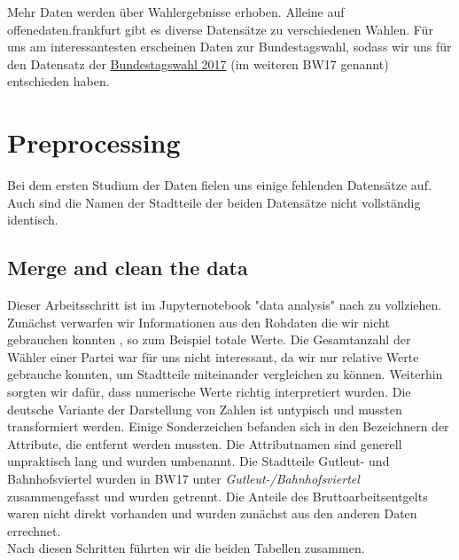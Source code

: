 \documentclass[a4paper,10pt]{scrartcl}
\begin{document}
Mehr Daten werden über Wahlergebnisse erhoben. Alleine auf offenedaten.frankfurt gibt es diverse Datensätze zu verschiedenen Wahlen. Für uns am interessantesten erscheinen Daten zur Bundestagswahl, sodass wir uns für den Datensatz der \href{https://offenedaten.frankfurt.de/dataset/bundestagswahl-2017-ergebnisse-in-frankfurt-am-main}{Bundestagswahl 2017} (im weiteren BW17 genannt) entschieden haben.



\section{Preprocessing}
Bei dem ersten Studium der Daten fielen uns einige fehlenden Datensätze auf. Auch sind die Namen der Stadtteile der beiden Datensätze nicht vollständig identisch.

\subsection{Merge and clean the data}
Dieser Arbeitsschritt ist im Jupyternotebook "data analysis" nach zu vollziehen.\\
Zunächst verwarfen wir Informationen aus den Rohdaten die wir nicht gebrauchen konnten , so zum Beispiel totale Werte. Die Gesamtanzahl der Wähler einer Partei war für uns nicht interessant, da wir nur relative Werte gebrauche konnten, um Stadtteile miteinander vergleichen zu können. Weiterhin sorgten wir dafür, dass numerische Werte richtig interpretiert wurden. Die deutsche Variante der Darstellung von Zahlen ist untypisch und mussten transformiert werden. Einige Sonderzeichen befanden sich in den Bezeichnern der Attribute, die entfernt werden mussten. Die Attributnamen sind generell unpraktisch lang und wurden umbenannt. Die Stadtteile Gutleut- und Bahnhofsviertel wurden in BW17 unter \emph{Gutleut-/Bahnhofsviertel} zusammengefasst und wurden getrennt. Die Anteile des Bruttoarbeitsentgelts waren nicht direkt vorhanden und wurden zunächst aus den anderen Daten errechnet.\\
Nach diesen Schritten führten wir die beiden Tabellen zusammen.
\end{document}
